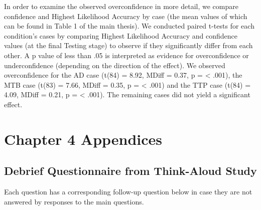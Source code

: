 \documentclass[a4paper, nobind]{templates/ociamthesis}
\begin{document}
In order to examine the observed overconfidence in more detail, we compare confidence and Highest Likelihood Accuracy by case (the mean values of which can be found in Table 1 of the main thesis). We conducted paired t-tests for each condition's cases by comparing Highest Likelihood Accuracy and confidence values (at the final Testing stage) to observe if they significantly differ from each other. A p value of less than .05 is interpreted as evidence for overconfidence or underconfidence (depending on the direction of the effect). We observed overconfidence for the AD case (t(84) = 8.92, MDiff = 0.37, p = \textless{} .001), the MTB case (t(83) = 7.66, MDiff = 0.35, p = \textless{} .001) and the TTP case (t(84) = 4.09, MDiff = 0.21, p = \textless{} .001). The remaining cases did not yield a significant effect.

\newpage

\chapter{Chapter 4 Appendices}\label{chapter-4-appendices}

\section{Debrief Questionnaire from Think-Aloud Study}\label{debriefqs}

Each question has a corresponding follow-up question below in case they are not answered by responses to the main questions.
\end{document}
